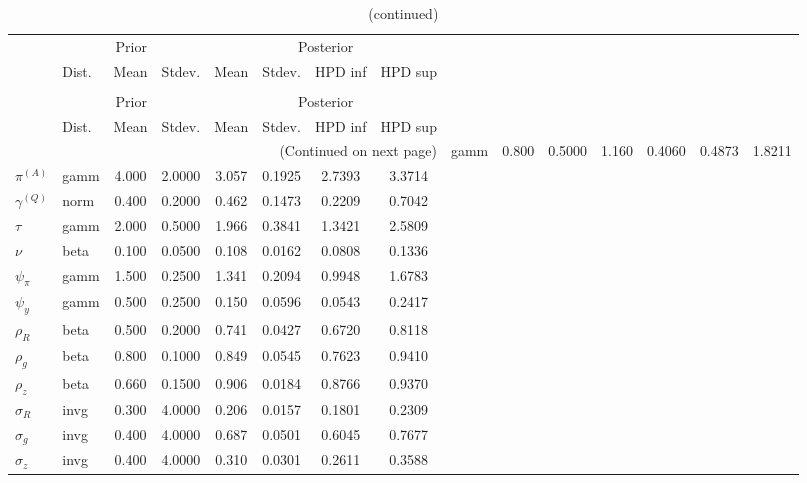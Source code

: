  
\begin{center}
\begin{longtable}{llcccccc} 
\caption{Results from Metropolis-Hastings (parameters)}
 \label{Table:MHPosterior:1}\\
\toprule 
  & \multicolumn{3}{c}{Prior}  &  \multicolumn{4}{c}{Posterior} \\
  \cmidrule(r{.75em}){2-4} \cmidrule(r{.75em}){5-8}
  & Dist. & Mean  & Stdev. & Mean & Stdev. & HPD inf & HPD sup\\
\midrule \endfirsthead 
\caption{(continued)}\\\toprule 
  & \multicolumn{3}{c}{Prior}  &  \multicolumn{4}{c}{Posterior} \\
  \cmidrule(r{.75em}){2-4} \cmidrule(r{.75em}){5-8}
  & Dist. & Mean  & Stdev. & Mean & Stdev. & HPD inf & HPD sup\\
\midrule \endhead 
\bottomrule \multicolumn{8}{r}{(Continued on next page)} \endfoot 
\bottomrule \endlastfoot 
${r_{A}}$ & gamm &   0.800 & 0.5000 &   1.160& 0.4060 &  0.4873 &  1.8211 \\ 
${\pi^{(A)}}$ & gamm &   4.000 & 2.0000 &   3.057& 0.1925 &  2.7393 &  3.3714 \\ 
${\gamma^{(Q)}}$ & norm &   0.400 & 0.2000 &   0.462& 0.1473 &  0.2209 &  0.7042 \\ 
${\tau}$ & gamm &   2.000 & 0.5000 &   1.966& 0.3841 &  1.3421 &  2.5809 \\ 
${\nu}$ & beta &   0.100 & 0.0500 &   0.108& 0.0162 &  0.0808 &  0.1336 \\ 
${\psi_\pi}$ & gamm &   1.500 & 0.2500 &   1.341& 0.2094 &  0.9948 &  1.6783 \\ 
${\psi_y}$ & gamm &   0.500 & 0.2500 &   0.150& 0.0596 &  0.0543 &  0.2417 \\ 
${\rho_R}$ & beta &   0.500 & 0.2000 &   0.741& 0.0427 &  0.6720 &  0.8118 \\ 
${\rho_{g}}$ & beta &   0.800 & 0.1000 &   0.849& 0.0545 &  0.7623 &  0.9410 \\ 
${\rho_z}$ & beta &   0.660 & 0.1500 &   0.906& 0.0184 &  0.8766 &  0.9370 \\ 
${\sigma_R}$ & invg &   0.300 & 4.0000 &   0.206& 0.0157 &  0.1801 &  0.2309 \\ 
${\sigma_{g}}$ & invg &   0.400 & 4.0000 &   0.687& 0.0501 &  0.6045 &  0.7677 \\ 
${\sigma_z}$ & invg &   0.400 & 4.0000 &   0.310& 0.0301 &  0.2611 &  0.3588 \\ 
\end{longtable}
 \end{center}
